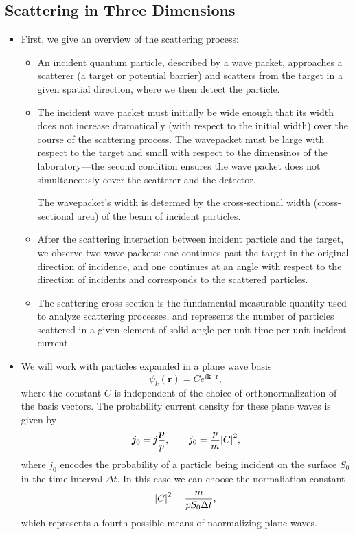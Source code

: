 \documentclass[11pt, a4paper]{article}
\renewcommand{\vec}[1]{\bm{#1}}  %
\renewcommand{\r}{\vec{r}}  %
\begin{document}
\subsection{Scattering in Three Dimensions}
\begin{itemize}
    \item First, we give an overview of the scattering process:
    \begin{itemize}
        \item An incident quantum particle, described by a wave packet, approaches a scatterer (a target or potential barrier) and scatters from the target in a given spatial direction, where we then detect the particle.

        \item The incident wave packet must initially be wide enough that its width does not increase dramatically (with respect to the initial width) over the course of the scattering process. The wavepacket must be large with respect to the target and small with respect to the dimensinos of the laboratory---the second condition ensures the wave packet does not simultaneously cover the scatterer and the detector. 

        The wavepacket's width is determed by the cross-sectional width (cross-sectional area) of the beam of incident particles. 

        \item After the scattering interaction between incident particle and the target, we observe two wave packets: one continues past the target in the original direction of incidence, and one continues at an angle with respect to the direction of incidents and corresponds to the scattered particles. 

        \item The scattering cross section is the fundamental measurable quantity used to analyze scattering processes, and represents the number of particles scattered in a given element of solid angle per unit time per unit incident current.

    \end{itemize}

    \item We will work with particles expanded in a plane wave basis
    \begin{equation*}
        \psi_{k}(\r) = C e^{i \vec{k} \cdot \r},
    \end{equation*}
    where the constant $ C $ is independent of the choice of orthonormalization of the basis vectors. The probability current density for these plane waves is given by
    \begin{equation*}
        \vec{j}_{0} = j_{} \frac{\vec{p}}{p}, \qquad j_{0} = \frac{p}{m} \abs{C}^{2},
    \end{equation*}
    where $ j_{0} $ encodes the probability of a particle being incident on the surface $ S_{0} $ in the time interval $ \Delta t $. In this case we can choose the normaliation constant 
    \begin{equation*}
        \abs{C}^{2} = \frac{m}{pS_{0}\Delta t},
    \end{equation*}
    which represents a fourth possible means of naormalizing plane waves. 


\end{itemize}
\end{document}
